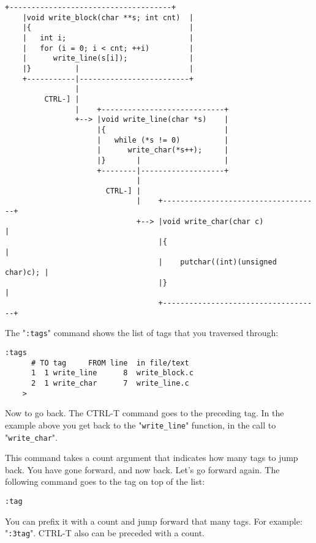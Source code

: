 \begin{Verbatim}[samepage=true]
    +-------------------------------------+
    |void write_block(char **s; int cnt)  |
    |{                                    |
    |   int i;                            |
    |   for (i = 0; i < cnt; ++i)         |
    |      write_line(s[i]);              |
    |}          |                         |
    +-----------|-------------------------+
                |
         CTRL-] |
                |    +----------------------------+
                +--> |void write_line(char *s)    |
                     |{                           |
                     |   while (*s != 0)          |
                     |      write_char(*s++);     |
                     |}       |                   |
                     +--------|-------------------+
                              |
                       CTRL-] |
                              |    +------------------------------------+
                              +--> |void write_char(char c)             |
                                   |{                                   |
                                   |    putchar((int)(unsigned char)c); |
                                   |}                                   |
                                   +------------------------------------+
\end{Verbatim}

The "\verb!:tags!" command shows the list of tags that you traversed through:

\begin{Verbatim}[samepage=true]
    :tags
      # TO tag     FROM line  in file/text 
      1  1 write_line      8  write_block.c 
      2  1 write_char      7  write_line.c 
    > 
\end{Verbatim}

Now to go back.
The CTRL-T command goes to the preceding tag.
In the example above you get back to the "\verb!write_line!" function, in the call to "\verb!write_char!".

This command takes a count argument that indicates how many tags to jump back.
You have gone forward, and now back.
Let's go forward again.
The following command goes to the tag on top of the list:

\begin{Verbatim}[samepage=true]
 :tag
\end{Verbatim}

You can prefix it with a count and jump forward that many tags.
For example: "\verb!:3tag!".
CTRL-T also can be preceded with a count.

